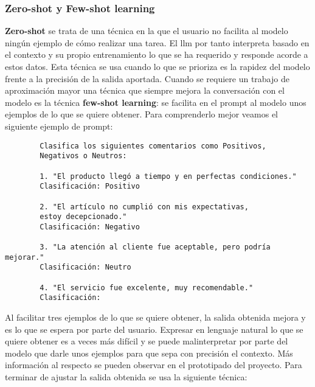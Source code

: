	\subsubsection{Zero-shot y Few-shot learning}
	\textbf{Zero-shot} se trata de una técnica en la que el usuario no facilita al modelo ningún ejemplo de cómo realizar una tarea. El \acrshort{llm} por tanto interpreta basado en el contexto y su propio entrenamiento lo que se ha requerido y responde acorde a estos datos. Esta técnica se usa cuando lo que se prioriza es la rapidez del modelo frente a la precisión de la salida aportada. Cuando se requiere un trabajo de aproximación mayor una técnica que siempre mejora la conversación con el modelo es la técnica \textbf{few-shot learning}: se facilita en el prompt al modelo unos ejemplos de lo que se quiere obtener. Para comprenderlo mejor veamos el siguiente ejemplo de prompt: 
	\begin{verbatim}
		Clasifica los siguientes comentarios como Positivos, 
		Negativos o Neutros:
		
		1. "El producto llegó a tiempo y en perfectas condiciones."
		Clasificación: Positivo
		
		2. "El artículo no cumplió con mis expectativas, 
		estoy decepcionado."
		Clasificación: Negativo
		
		3. "La atención al cliente fue aceptable, pero podría mejorar."
		Clasificación: Neutro
		
		4. "El servicio fue excelente, muy recomendable."
		Clasificación:
	\end{verbatim}
	Al facilitar tres ejemplos de lo que se quiere obtener, la salida obtenida mejora y es lo que se espera por parte del usuario. Expresar en lenguaje natural lo que se quiere obtener es a veces más difícil y se puede malinterpretar por parte del modelo que darle unos ejemplos para que sepa con precisión el contexto. Más información al respecto se pueden observar en el prototipado del proyecto. Para terminar de ajustar la salida obtenida se usa la siguiente técnica:
	
